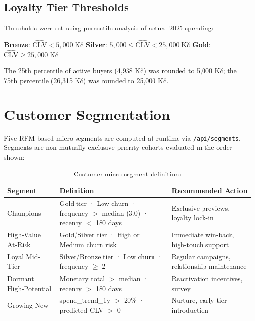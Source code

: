 \documentclass[11pt,a4paper]{article}
\begin{document}
\subsection{Loyalty Tier Thresholds}

Thresholds were set using percentile analysis of actual 2025 spending:

\begin{center}
  \textbf{Bronze}: $\hat{\text{CLV}} < 5{,}000$ Kč \quad
  \textbf{Silver}: $5{,}000 \leq \hat{\text{CLV}} < 25{,}000$ Kč \quad
  \textbf{Gold}: $\hat{\text{CLV}} \geq 25{,}000$ Kč
\end{center}

The 25th percentile of active buyers (4{,}938 Kč) was rounded to 5{,}000 Kč;
the 75th percentile (26{,}315 Kč) was rounded to 25{,}000 Kč.

\section{Customer Segmentation}

Five RFM-based micro-segments are computed at runtime via \texttt{/api/segments}.
Segments are non-mutually-exclusive priority cohorts evaluated in the order shown:

\begin{table}[H]
\centering\small
\begin{tabular}{p{3.2cm}p{5.5cm}p{4cm}}
\toprule
\textbf{Segment} & \textbf{Definition} & \textbf{Recommended Action} \\
\midrule
Champions
  & Gold tier · Low churn · frequency $>$ median (3.0) · recency $<$ 180 days
  & Exclusive previews, loyalty lock-in \\
\midrule
High-Value At-Risk
  & Gold/Silver tier · High or Medium churn risk
  & Immediate win-back, high-touch support \\
\midrule
Loyal Mid-Tier
  & Silver/Bronze tier · Low churn · frequency $\geq$ 2
  & Regular campaigns, relationship maintenance \\
\midrule
Dormant High-Potential
  & Monetary total $>$ median · recency $>$ 180 days
  & Reactivation incentives, survey \\
\midrule
Growing New
  & spend\_trend\_1y $>$ 20\% · predicted CLV $>$ 0
  & Nurture, early tier introduction \\
\bottomrule
\end{tabular}
\caption{Customer micro-segment definitions}
\end{table}
\end{document}
